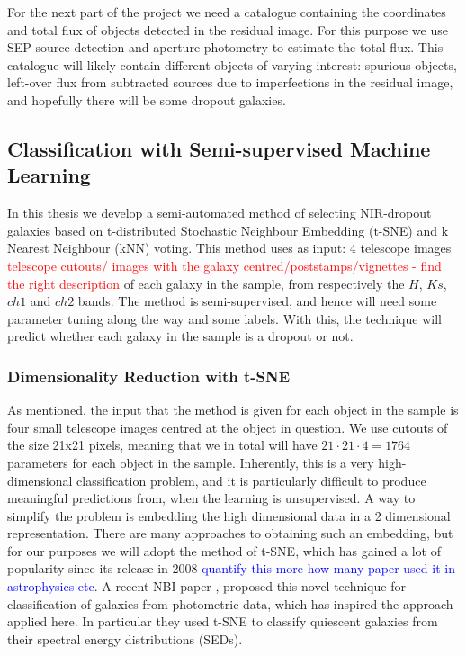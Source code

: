 For the next part of the project we need a catalogue containing the coordinates and total flux of objects detected in the residual image. For this purpose we use SEP source detection and aperture photometry to estimate the total flux. This catalogue will likely contain different objects of varying interest: spurious objects, left-over flux from subtracted sources due to imperfections in the residual image, and hopefully there will be some dropout galaxies.

\subsection{Classification with Semi-supervised Machine Learning}
In this thesis we develop a semi-automated method of selecting NIR-dropout galaxies based on t-distributed Stochastic Neighbour Embedding (t-SNE) \cite{Maaten_2008_tSNE} and k Nearest Neighbour (kNN) voting. This method uses as input: 4 telescope images \textcolor{red}{telescope cutouts/ images with the galaxy centred/poststamps/vignettes - find the right description} of each galaxy in the sample, from respectively the $H$, $Ks$, $ch1$ and $ch2$ bands. The method is semi-supervised, and hence will need some parameter tuning along the way and some labels. With this, the technique will predict whether each galaxy in the sample is a dropout or not.

\subsubsection{Dimensionality Reduction with t-SNE}
As mentioned, the input that the method is given for each object in the sample is four small telescope images centred at the object in question. We use cutouts of the size 21x21 pixels, meaning that we in total will have $21\cdot21\cdot4=1764$ parameters for each object in the sample. Inherently, this is a very high-dimensional classification problem, and it is particularly difficult to produce meaningful predictions from, when the learning is unsupervised. A way to simplify the problem is embedding the high dimensional data in a 2 dimensional representation. There are many approaches to obtaining such an embedding, but for our purposes we will adopt the method of t-SNE, which has gained a lot of popularity since its release in 2008 \textcolor{blue}{quantify this more how many paper used it in astrophysics etc}. A recent NBI paper \cite{Steinhardt_2020}, proposed this novel technique for classification of galaxies from photometric data, which has inspired the approach applied here. In particular they used t-SNE to classify quiescent galaxies from their spectral energy distributions (SEDs). \\

